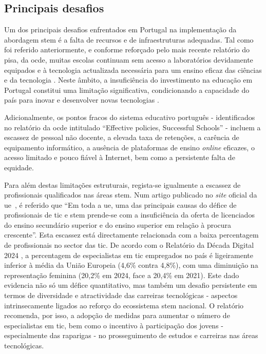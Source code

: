 \subsection{Principais desafios}
Um dos principais desafios enfrentados em Portugal na implementação da abordagem \acrshort{stem} é a falta de recursos e de infraestruturas adequadas. Tal como foi referido anteriormente, e conforme reforçado pelo mais recente relatório do \acrfull{pisa}, da \acrfull{ocde}, muitas escolas continuam sem acesso a laboratórios devidamente equipados e à tecnologia actualizada necessária para um ensino eficaz das ciências e da tecnologia \cite{pisa2022volume2}. Neste âmbito, a insuficiência do investimento na educação em Portugal constitui uma limitação significativa, condicionando a capacidade do país para inovar e desenvolver novas tecnologias \cite{Oquefalt37:online, Faltadei99:online, Odesinve56:online, EDUSTATP20:online, Portugal69:online}.

Adicionalmente, os pontos fracos do sistema educativo português - identificados no relatório da \acrshort{ocde} intitulado ``Effective policies, Successful Schools'' \cite{pisa2018volumeV} - incluem a escassez de pessoal não docente, a elevada taxa de retenções, a carência de equipamento informático, a ausência de plataformas de ensino \textit{online} eficazes, o acesso limitado e pouco fiável à Internet, bem como a persistente falta de equidade.

Para além destas limitações estruturais, regista-se igualmente a escassez de profissionais qualificados nas áreas \acrshort{stem}. Num artigo publicado no \textit{site} oficial da \acrshort{ue}~\cite{cedefop}, é referido que ``Em toda a \acrshort{ue}, uma das principais causas do défice de profissionais de \acrshort{tic} e \acrshort{stem} prende-se com a insuficiência da oferta de licenciados do ensino secundário superior e do ensino superior em relação à procura crescente''. Esta escassez está directamente relacionada com a baixa percentagem de profissionais no sector das \acrshort{tic}. De acordo com o Relatório da Década Digital 2024 \cite{DigitalDecade2024}, a percentagem de especialistas em \acrshort{tic} empregados no país é ligeiramente inferior à média da União Europeia (4,6\% contra 4,8\%), com uma diminuição na representação feminina (20,2\% em 2024, face a 20,4\% em 2021). Este dado evidencia não só um défice quantitativo, mas também um desafio persistente em termos de diversidade e atractividade das carreiras tecnológicas - aspectos intrinsecamente ligados ao reforço do ecossistema \acrshort{stem} nacional. O relatório recomenda, por isso, a adopção de medidas para aumentar o número de especialistas em \acrshort{tic}, bem como o incentivo à participação dos jovens - especialmente das raparigas - no prosseguimento de estudos e carreiras nas áreas tecnológicas. %

